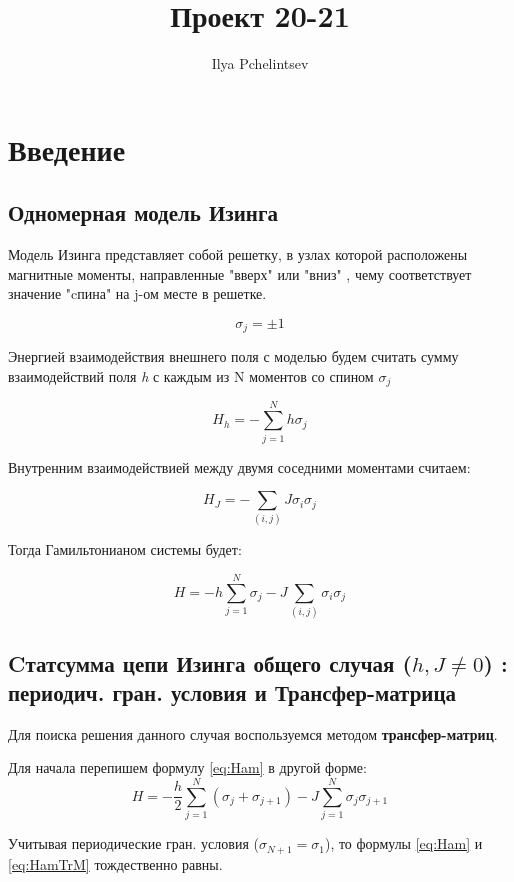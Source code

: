 \documentclass{article}
\title{Проект 20-21}
\author{Ilya Pchelintsev}
\date{}
\numberwithin{equation}{section}
\begin{document}
\maketitle

\section{Введение}

\subsection{Одномерная модель Изинга}

Модель Изинга представляет собой решетку, в узлах которой расположены магнитные моменты, направленные "вверх"  или "вниз" , чему соответствует значение "cпина" на j-ом месте в решетке.

\[ \sigma_{j} = \pm1 \]

Энергией взаимодействия внешнего поля с моделью будем считать сумму взаимодействий поля \textit{h} с каждым из N моментов со спином $\sigma_{j}$

\[ H_{h} = - \sum_{j = 1}^{N} h  \sigma_{j} \]

Внутренним взаимодействией между двумя соседними моментами считаем:

\[ H_{J} = - \sum_{(i,j)} J  \sigma_{i}  \sigma_{j} \]

Тогда Гамильтонианом системы будет:

\begin{equation}\label{eq:Ham} 
   H = - h\sum_{j = 1}^{N}  \sigma_{j} - J \sum_{(i,j)} \sigma_{i}  \sigma_{j} 
\end{equation}

\subsection{Cтатсумма цепи Изинга общего случая ($h, J \neq 0 $) : периодич. гран. условия и Трансфер-матрица}

Для поиска решения данного случая воспользуемся методом \textbf{трансфер-матриц}.

Для начала перепишем формулу \eqref{eq:Ham} в другой форме:
\begin{equation}\label{eq:HamTrM}
    H = - \frac{h}{2}\sum_{j = 1}^{N}  (\sigma_{j} + \sigma_{j+1}) - J \sum_{j = 1}^{N} \sigma_{j}  \sigma_{j+1} 
\end{equation}

Учитывая периодические гран. условия ($\sigma_{N+1} = \sigma_{1}$), то формулы \eqref{eq:Ham} и \eqref{eq:HamTrM} тождественно равны.
\end{document}
